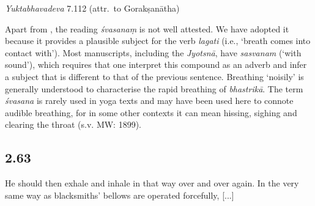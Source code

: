 \begin{ekdosis}
\begin{testimonia}[hp02_062]
\emph{Yuktabhavadeva} 7.112 (attr.~to Gorakṣanātha)

\begin{versinnote}
\end{versinnote}
\end{testimonia}

\begin{philcomm}[hp02_062]


Apart from \alphaOne, the reading \emph{śvasanaṃ} is not well attested. We have adopted it because it provides a plausible subject for the verb \emph{lagati} (i.e., `breath comes into contact with'). Most manuscripts, including the \emph{Jyotsnā}, have \emph{sasvanam} (`with sound'), which requires that one interpret this compound as an adverb and infer a subject that is different to that of the previous sentence. Breathing `noisily' is generally understood to characterise the rapid breathing of \emph{bhastrikā}. The term \emph{śvasana} is rarely used in yoga texts and may have been used here to connote audible breathing, for in some other contexts it can mean hissing, sighing and clearing the throat (s.v. MW: 1899).\lb   

\end{philcomm}

\subsection*{2.63}
\begin{translation}[hp02_063]
He should then exhale and inhale in that way over and over again. In the very same way as blacksmiths’ bellows are operated forcefully, [...]
\end{translation}


\end{ekdosis}
